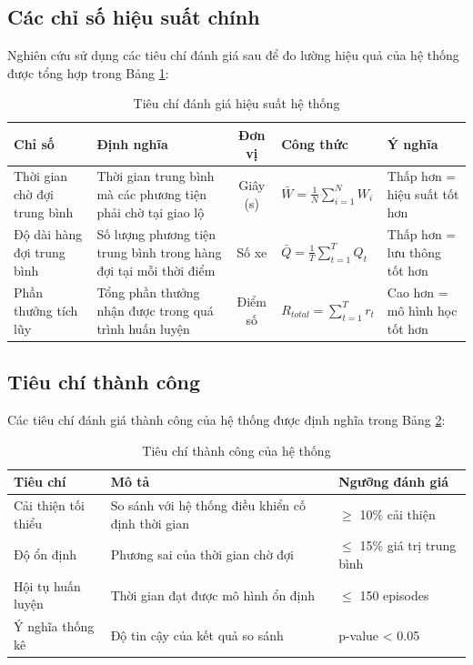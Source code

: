 \subsection{Các chỉ số hiệu suất chính}
Nghiên cứu sử dụng các tiêu chí đánh giá sau để đo lường hiệu quả của hệ thống được tổng hợp trong Bảng \ref{tab:evaluation_criteria}:

\begin{table}[!htp]
\centering
\caption{Tiêu chí đánh giá hiệu suất hệ thống}
\label{tab:evaluation_criteria}
\begin{tabular}{|l|p{3cm}|c|p{3.5cm}|p{3.5cm}|}
\hline
\textbf{Chỉ số} & \textbf{Định nghĩa} & \textbf{Đơn vị} & \textbf{Công thức} & \textbf{Ý nghĩa} \\
\hline
Thời gian chờ đợi trung bình & Thời gian trung bình mà các phương tiện phải chờ tại giao lộ & Giây (s) & $\bar{W} = \frac{1}{N} \sum_{i=1}^{N} W_i$ & Thấp hơn = hiệu suất tốt hơn \\
\hline
Độ dài hàng đợi trung bình & Số lượng phương tiện trung bình trong hàng đợi tại mỗi thời điểm & Số xe & $\bar{Q} = \frac{1}{T} \sum_{t=1}^{T} Q_t$ & Thấp hơn = lưu thông tốt hơn \\
\hline
Phần thưởng tích lũy & Tổng phần thưởng nhận được trong quá trình huấn luyện & Điểm số & $R_{total} = \sum_{t=1}^{T} r_t$ & Cao hơn = mô hình học tốt hơn \\
\hline
\end{tabular}
\end{table}

\subsection{Tiêu chí thành công}
Các tiêu chí đánh giá thành công của hệ thống được định nghĩa trong Bảng \ref{tab:success_criteria}:

\begin{table}[!htp]
\centering
\caption{Tiêu chí thành công của hệ thống}
\label{tab:success_criteria}
\begin{tabular}{|l|p{8cm}|p{4cm}|}
\hline
\textbf{Tiêu chí} & \textbf{Mô tả} & \textbf{Ngưỡng đánh giá} \\
\hline
Cải thiện tối thiểu & So sánh với hệ thống điều khiển cố định thời gian & $\geq$ 10\% cải thiện \\
\hline
Độ ổn định & Phương sai của thời gian chờ đợi & $\leq$ 15\% giá trị trung bình \\
\hline
Hội tụ huấn luyện & Thời gian đạt được mô hình ổn định & $\leq$ 150 episodes \\
\hline
Ý nghĩa thống kê & Độ tin cậy của kết quả so sánh & p-value < 0.05 \\
\hline
\end{tabular}
\end{table}

